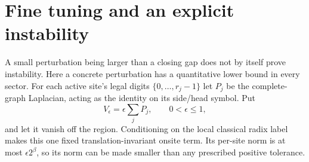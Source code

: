 \section{Fine tuning and an explicit instability}\label{sec:instability}
A small perturbation being larger than a closing gap does not by
itself prove instability. Here a concrete perturbation has a
quantitative lower bound in every sector. For each active site's
legal digits $\{0,\ldots,r_j-1\}$ let $P_j$ be the complete-graph
Laplacian, acting as the identity on its side/head symbol. Put
\[
 V_\epsilon=\epsilon\sum_jP_j,\qquad 0<\epsilon\leq1,
\]
and let it vanish off the region. Conditioning on the local classical
radix label makes this one fixed translation-invariant onsite term.
Its per-site norm is at most $\epsilon2^\beta$, so its norm can be
made smaller than any prescribed positive tolerance.

